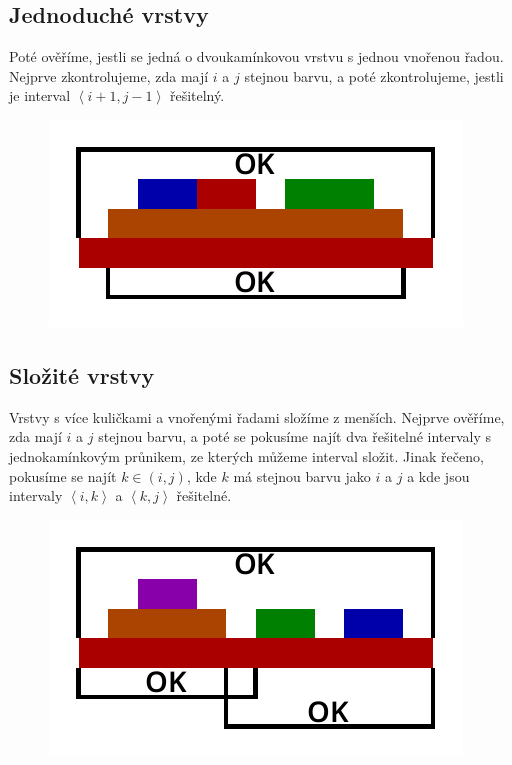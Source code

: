 \documentclass{article}
\begin{document}
\subsection{Jednoduché vrstvy}

Poté ověříme, jestli se jedná o dvoukamínkovou vrstvu s jednou vnořenou řadou. Nejprve zkontrolujeme, zda mají $i$ a $j$ stejnou barvu, a poté zkontrolujeme, jestli je interval $\left<i + 1, j - 1\right>$ řešitelný.

\begin{figure}[H]
    \centering
    \includegraphics[scale=1]{solve-simple-layer.pdf}
\end{figure}

\subsection{Složité vrstvy}

Vrstvy s více kuličkami a vnořenými řadami složíme z menších. Nejprve ověříme, zda mají $i$ a $j$ stejnou barvu, a poté se pokusíme najít dva řešitelné intervaly s jednokamínkovým průnikem, ze kterých můžeme interval složit. Jinak řečeno, pokusíme se najít $k \in \left(i, j\right)$, kde $k$ má stejnou barvu jako $i$ a $j$ a kde jsou intervaly $\left<i, k\right>$ a $\left<k, j\right>$ řešitelné.

\begin{figure}[H]
    \centering
    \includegraphics[scale=1]{solve-complex-layer.pdf}
\end{figure}
\end{document}
